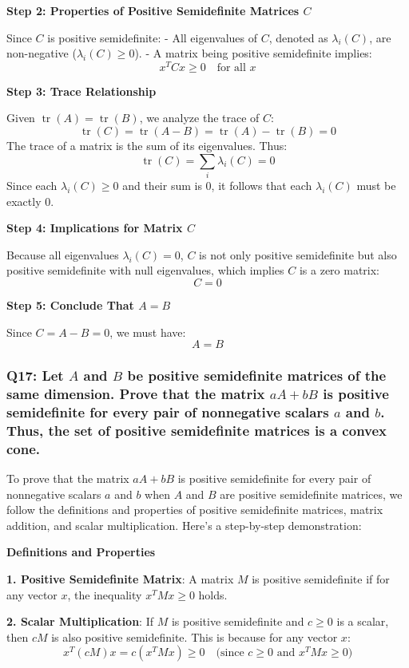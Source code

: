 \documentclass[8pt]{article}
\begin{document}
\textbf{Step 2: Properties of Positive Semidefinite Matrices \(C\)}

Since \(C\) is positive semidefinite:
- All eigenvalues of \(C\), denoted as \(\lambda_i(C)\), are non-negative (\(\lambda_i(C) \geq 0\)).
- A matrix being positive semidefinite implies:
  \[
  x^T C x \geq 0 \quad \text{for all } x
  \]

\textbf{Step 3: Trace Relationship}

Given \(\operatorname{tr}(A) = \operatorname{tr}(B)\), we analyze the trace of \(C\):
\[
\operatorname{tr}(C) = \operatorname{tr}(A - B) = \operatorname{tr}(A) - \operatorname{tr}(B) = 0
\]
The trace of a matrix is the sum of its eigenvalues. Thus:
\[
\operatorname{tr}(C) = \sum_i \lambda_i(C) = 0
\]
Since each \(\lambda_i(C) \geq 0\) and their sum is 0, it follows that each \(\lambda_i(C)\) must be exactly 0.

\textbf{Step 4: Implications for Matrix \(C\)}

Because all eigenvalues \(\lambda_i(C) = 0\), \(C\) is not only positive semidefinite but also positive semidefinite with null eigenvalues, which implies \(C\) is a zero matrix:
\[
C = 0
\]

\textbf{Step 5: Conclude That \(A = B\)}

Since \(C = A - B = 0\), we must have:
\[
A = B
\]


\subsubsection*{Q17: Let \(A\) and \(B\) be positive semidefinite matrices of the same dimension. Prove that the matrix \(aA + bB\) is positive semidefinite for every pair of nonnegative scalars \(a\) and \(b\). Thus, the set of positive semidefinite matrices is a convex cone.}

To prove that the matrix \(aA + bB\) is positive semidefinite for every pair of nonnegative scalars \(a\) and \(b\) when \(A\) and \(B\) are positive semidefinite matrices, we follow the definitions and properties of positive semidefinite matrices, matrix addition, and scalar multiplication. Here's a step-by-step demonstration:

\textbf{Definitions and Properties}

\textbf{1. Positive Semidefinite Matrix}:
   A matrix \(M\) is positive semidefinite if for any vector \(x\), the inequality \(x^T M x \geq 0\) holds.

\textbf{2. Scalar Multiplication}:
   If \(M\) is positive semidefinite and \(c \geq 0\) is a scalar, then \(cM\) is also positive semidefinite. This is because for any vector \(x\):
   \[
   x^T (cM) x = c(x^T M x) \geq 0 \quad \text{(since \(c \geq 0\) and \(x^T M x \geq 0\))}
   \]
\end{document}

